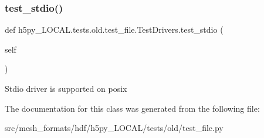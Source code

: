 \subsubsection{\texorpdfstring{test\+\_\+stdio()}{test\_stdio()}}
{\footnotesize\ttfamily def h5py\+\_\+\+L\+O\+C\+A\+L.\+tests.\+old.\+test\+\_\+file.\+Test\+Drivers.\+test\+\_\+stdio (\begin{DoxyParamCaption}\item[{}]{self }\end{DoxyParamCaption})}

\begin{DoxyVerb}Stdio driver is supported on posix \end{DoxyVerb}
 

The documentation for this class was generated from the following file\+:\begin{DoxyCompactItemize}
\item 
src/mesh\+\_\+formats/hdf/h5py\+\_\+\+L\+O\+C\+A\+L/tests/old/test\+\_\+file.\+py\end{DoxyCompactItemize}
